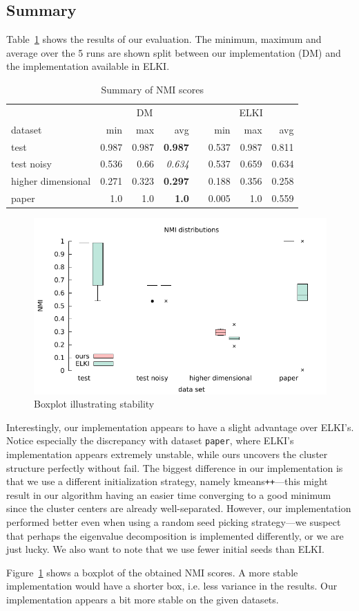 \documentclass[english]{scrartcl}
\begin{document}
\subsection{Summary}

Table~\ref{tab:overview} shows the results of our evaluation. The minimum,
maximum and average over the 5 runs are shown split between our implementation
(DM) and the implementation available in ELKI.

\begin{table}[btp]\centering
  \begin{tabular}{lrrrcrrr}\toprule
     & \multicolumn{3}{c}{DM} & \phantom{abc} & \multicolumn{3}{c}{ELKI}\\
    dataset & min & max & avg & & min & max & avg\\ \midrule
    test & 0.987 & 0.987 & \textbf{0.987} & & 0.537 & 0.987 & 0.811\\
    test noisy & 0.536 & 0.66 & \emph{0.634} & & 0.537 & 0.659 & 0.634\\
    higher dimensional & 0.271 & 0.323 & \textbf{0.297} & & 0.188 & 0.356 & 0.258\\
    paper & 1.0 & 1.0 & \textbf{1.0} & & 0.005 & 1.0 & 0.559\\
  \bottomrule
  \end{tabular}
  \caption{Summary of NMI scores}
  \label{tab:overview}
\end{table}

\begin{figure}[t!]
    \centering
    \includegraphics[width=\textwidth]{img/boxplt}
    \caption{Boxplot illustrating stability}
    \label{fig:box}
\end{figure}

Interestingly, our implementation appears to have a slight advantage over
ELKI's.  Notice especially the discrepancy with dataset \texttt{paper}, where
ELKI's implementation appears extremely unstable, while ours uncovers the
cluster structure perfectly without fail. The biggest difference in our
implementation is that we use a different initialization strategy, namely
kmeans\texttt{++}---this might result in our algorithm having an easier time
converging to a good minimum since the cluster centers are already
well-separated. However, our implementation performed better even when using a
random seed picking strategy---we suspect that perhaps the eigenvalue
decomposition is implemented differently, or we are just lucky. We also want to
note that we use fewer initial seeds than ELKI.

Figure~\ref{fig:box} shows a boxplot of the obtained NMI scores. A more stable implementation
would have a shorter box, i.e. less variance in the results. Our implementation appears
a bit more stable on the given datasets.
\end{document}
